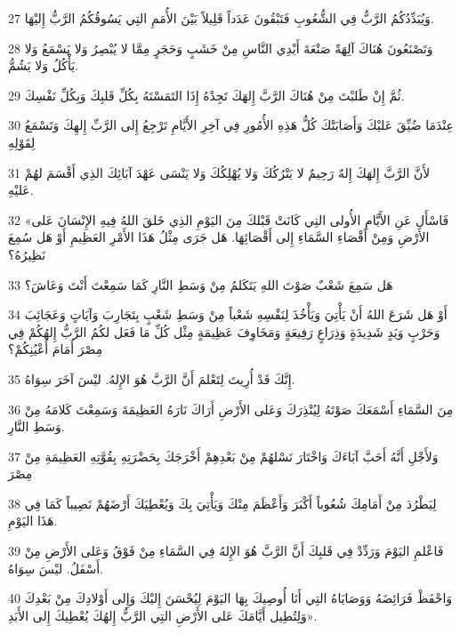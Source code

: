 \par 27 وَيُبَدِّدُكُمُ الرَّبُّ فِي الشُّعُوبِ فَتَبْقُونَ عَدَداً قَلِيلاً بَيْنَ الأُمَمِ التِي يَسُوقُكُمُ الرَّبُّ إِليْهَا.
\par 28 وَتَصْنَعُونَ هُنَاكَ آلِهَةً صَنْعَةَ أَيْدِي النَّاسِ مِنْ خَشَبٍ وَحَجَرٍ مِمَّا لا يُبْصِرُ وَلا يَسْمَعُ وَلا يَأْكُلُ وَلا يَشُمُّ.
\par 29 ثُمَّ إِنْ طَلبْتَ مِنْ هُنَاكَ الرَّبَّ إِلهَكَ تَجِدْهُ إِذَا التَمَسْتَهُ بِكُلِّ قَلبِكَ وَبِكُلِّ نَفْسِكَ.
\par 30 عِنْدَمَا ضُيِّقَ عَليْكَ وَأَصَابَتْكَ كُلُّ هَذِهِ الأُمُورِ فِي آخِرِ الأَيَّامِ تَرْجِعُ إِلى الرَّبِّ إِلهِكَ وَتَسْمَعُ لِقَوْلِهِ
\par 31 لأَنَّ الرَّبَّ إِلهَكَ إِلهٌ رَحِيمٌ لا يَتْرُكُكَ وَلا يُهْلِكُكَ وَلا يَنْسَى عَهْدَ آبَائِكَ الذِي أَقْسَمَ لهُمْ عَليْهِ.
\par 32 «فَاسْأَل عَنِ الأَيَّامِ الأُولى التِي كَانَتْ قَبْلكَ مِنَ اليَوْمِ الذِي خَلقَ اللهُ فِيهِ الإِنْسَانَ عَلى الأَرْضِ وَمِنْ أَقْصَاءِ السَّمَاءِ إِلى أَقْصَائِهَا. هَل جَرَى مِثْلُ هَذَا الأَمْرِ العَظِيمِ أَوْ هَل سُمِعَ نَظِيرُهُ؟
\par 33 هَل سَمِعَ شَعْبٌ صَوْتَ اللهِ يَتَكَلمُ مِنْ وَسَطِ النَّارِ كَمَا سَمِعْتَ أَنْتَ وَعَاشَ؟
\par 34 أَوْ هَل شَرَعَ اللهُ أَنْ يَأْتِيَ وَيَأْخُذَ لِنَفْسِهِ شَعْباً مِنْ وَسَطِ شَعْبٍ بِتَجَارِبَ وَآيَاتٍ وَعَجَائِبَ وَحَرْبٍ وَيَدٍ شَدِيدَةٍ وَذِرَاعٍ رَفِيعَةٍ وَمَخَاوِفَ عَظِيمَةٍ مِثْل كُلِّ مَا فَعَل لكُمُ الرَّبُّ إِلهُكُمْ فِي مِصْرَ أَمَامَ أَعْيُنِكُمْ؟
\par 35 إِنَّكَ قَدْ أُرِيتَ لِتَعْلمَ أَنَّ الرَّبَّ هُوَ الإِلهُ. ليْسَ آخَرَ سِوَاهُ.
\par 36 مِنَ السَّمَاءِ أَسْمَعَكَ صَوْتَهُ لِيُنْذِرَكَ وَعَلى الأَرْضِ أَرَاكَ نَارَهُ العَظِيمَةَ وَسَمِعْتَ كَلامَهُ مِنْ وَسَطِ النَّارِ.
\par 37 وَلأَجْلِ أَنَّهُ أَحَبَّ آبَاءَكَ وَاخْتَارَ نَسْلهُمْ مِنْ بَعْدِهِمْ أَخْرَجَكَ بِحَضْرَتِهِ بِقُوَّتِهِ العَظِيمَةِ مِنْ مِصْرَ
\par 38 لِيَطْرُدَ مِنْ أَمَامِكَ شُعُوباً أَكْبَرَ وَأَعْظَمَ مِنْكَ وَيَأْتِيَ بِكَ وَيُعْطِيَكَ أَرْضَهُمْ نَصِيباً كَمَا فِي هَذَا اليَوْمِ.
\par 39 فَاعْلمِ اليَوْمَ وَرَدِّدْ فِي قَلبِكَ أَنَّ الرَّبَّ هُوَ الإِلهُ فِي السَّمَاءِ مِنْ فَوْقُ وَعَلى الأَرْضِ مِنْ أَسْفَلُ. ليْسَ سِوَاهُ.
\par 40 وَاحْفَظْ فَرَائِضَهُ وَوَصَايَاهُ التِي أَنَا أُوصِيكَ بِهَا اليَوْمَ لِيُحْسَنَ إِليْكَ وَإِلى أَوْلادِكَ مِنْ بَعْدِكَ وَلِتُطِيل أَيَّامَكَ عَلى الأَرْضِ التِي الرَّبُّ إِلهُكَ يُعْطِيكَ إِلى الأَبَدِ».

